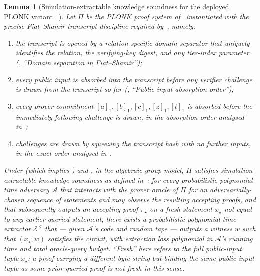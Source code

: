 \documentclass[11pt,a4paper]{article}
\theoremstyle{plain}
\newtheorem{lemma}{Lemma}
\theoremstyle{definition}
\newcommand{\Adv}{\mathcal{A}}
\begin{document}
\begin{lemma}[Simulation-extractable knowledge soundness for the
deployed PLONK variant%
~\cite{gabizon-2019-plonk,ganesh-2022-simext-plonk}]
\label{lem:plonk-se}
Let $\Pi$ be the PLONK proof system of~\cite{gabizon-2019-plonk}
instantiated with the precise Fiat--Shamir transcript discipline
required by~\cite{ganesh-2022-simext-plonk}, namely:
\begin{enumerate}[label=(\roman*),leftmargin=2em]
  \item the transcript is opened by a relation-specific domain
    separator that uniquely identifies the relation, the
    verifying-key digest, and any tier-index parameter
    (, ``Domain separation in Fiat--Shamir'');
  \item every public input is absorbed into the transcript
    \emph{before} any verifier challenge is drawn from the
    transcript-so-far (, ``Public-input
    absorption order'');
  \item every prover commitment $[a]_1, [b]_1, [c]_1, [z]_1,
    [t]_1$ is absorbed before the immediately following
    challenge is drawn, in the absorption order analysed
    in~\cite{ganesh-2022-simext-plonk};
  \item challenges are drawn by squeezing the transcript hash
    with no further inputs, in the exact order analysed in
    \cite{ganesh-2022-simext-plonk}.
\end{enumerate}

Under  (which implies ) and
, in the algebraic group model, $\Pi$ satisfies
\emph{simulation-extractable knowledge soundness} as defined
in~\cite{ganesh-2022-simext-plonk}: for every probabilistic
polynomial-time adversary $\Adv$ that interacts with the prover
oracle of $\Pi$ for an adversarially-chosen sequence of
statements and may observe the resulting accepting proofs, and
that subsequently outputs an accepting proof $\pi_{\star}$ on a
\emph{fresh} statement $x_{\star}$ not equal to any earlier
queried statement, there exists a probabilistic polynomial-time
extractor $\mathcal{E}^{\Adv}$ that --- given $\Adv$'s code and
random tape --- outputs a witness $w$ such that $(x_{\star}; w)$
satisfies the circuit, with extraction loss polynomial in $\Adv$'s
running time and total oracle-query budget. ``Fresh'' here refers
to the full public-input tuple $x_{\star}$: a proof carrying a
different byte string but binding the same public-input tuple as
some prior queried proof is not fresh in this sense.
\end{lemma}
\end{document}
